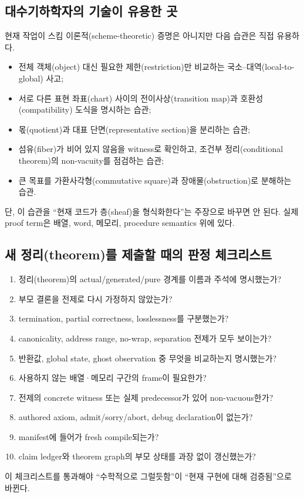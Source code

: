 \subsection{대수기하학자의 기술이 유용한 곳}

현재 작업이 스킴 이론적(scheme-theoretic) 증명은 아니지만 다음 습관은 직접
유용하다.

\begin{itemize}
  \item 전체 객체(object) 대신 필요한 제한(restriction)만 비교하는
        국소--대역(local-to-global) 사고;
  \item 서로 다른 표현 좌표(chart) 사이의 전이사상(transition map)과
        호환성(compatibility) 도식을 명시하는 습관;
  \item 몫(quotient)과 대표 단면(representative section)을 분리하는 습관;
  \item 섬유(fiber)가 비어 있지 않음을 witness로 확인하고,
        조건부 정리(conditional theorem)의
        non-vacuity를 점검하는 습관;
  \item 큰 목표를 가환사각형(commutative square)과 장애물(obstruction)로
        분해하는 습관.
\end{itemize}

단, 이 습관을 ``현재 코드가 층(sheaf)을 형식화한다''는 주장으로 바꾸면 안 된다.
실제 proof term은 배열, word, 메모리, procedure semantics 위에 있다.

\subsection{새 정리(theorem)를 제출할 때의 판정 체크리스트}

\begin{enumerate}
  \item 정리(theorem)의 actual/generated/pure 경계를 이름과 주석에 명시했는가?
  \item 부모 결론을 전제로 다시 가정하지 않았는가?
  \item termination, partial correctness, losslessness를 구분했는가?
  \item canonicality, address range, no-wrap, separation 전제가 모두 보이는가?
  \item 반환값, global state, ghost observation 중 무엇을 비교하는지 명시했는가?
  \item 사용하지 않는 배열·메모리 구간의 frame이 필요한가?
  \item 전제의 concrete witness 또는 실제 predecessor가 있어 non-vacuous한가?
  \item authored axiom, admit/sorry/abort, debug declaration이 없는가?
  \item manifest에 들어가 fresh  compile되는가?
  \item claim ledger와 theorem graph의 부모 상태를 과장 없이 갱신했는가?
\end{enumerate}

이 체크리스트를 통과해야 ``수학적으로 그럴듯함''이 ``현재 구현에 대해
검증됨''으로 바뀐다.
